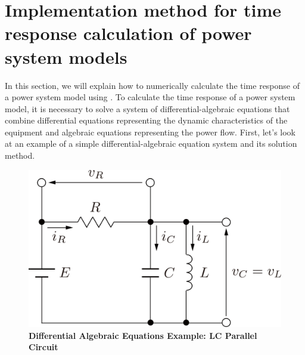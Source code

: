 \documentclass[graybox, envcountchap]{svmult}
\begin{document}
\section{Implementation method for time response calculation of power system
models}\label{sec:timerescal}

In this section, we will explain how to numerically calculate the time response
of a power system model using \matlab. To calculate the time response of a power
system model, it is necessary to solve a system of differential-algebraic
equations that combine differential equations representing the dynamic
characteristics of the equipment and algebraic equations representing the power
flow. First, let's look at an example of a simple differential-algebraic
equation system and its solution method.

\begin{figure}[t]
  \centering
  \includegraphics[width = .5\linewidth]{figs/circkawaguchi}
  \medskip
  \caption{\centering\textbf{Differential Algebraic Equations Example: LC
  Parallel Circuit}}
  \label{fig:RLC}
  \medskip
\end{figure}
\end{document}
